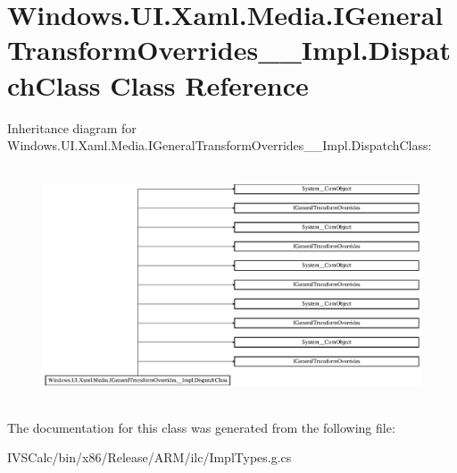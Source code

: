 \hypertarget{class_windows_1_1_u_i_1_1_xaml_1_1_media_1_1_i_general_transform_overrides_____impl_1_1_dispatch_class}{}\section{Windows.\+U\+I.\+Xaml.\+Media.\+I\+General\+Transform\+Overrides\+\_\+\+\_\+\+Impl.\+Dispatch\+Class Class Reference}
\label{class_windows_1_1_u_i_1_1_xaml_1_1_media_1_1_i_general_transform_overrides_____impl_1_1_dispatch_class}
Inheritance diagram for Windows.\+U\+I.\+Xaml.\+Media.\+I\+General\+Transform\+Overrides\+\_\+\+\_\+\+Impl.\+Dispatch\+Class\+:\begin{figure}[H]
\begin{center}
\leavevmode
\includegraphics[height=6.968326cm]{class_windows_1_1_u_i_1_1_xaml_1_1_media_1_1_i_general_transform_overrides_____impl_1_1_dispatch_class}
\end{center}
\end{figure}


The documentation for this class was generated from the following file\+:\begin{DoxyCompactItemize}
\item 
I\+V\+S\+Calc/bin/x86/\+Release/\+A\+R\+M/ilc/Impl\+Types.\+g.\+cs\end{DoxyCompactItemize}
